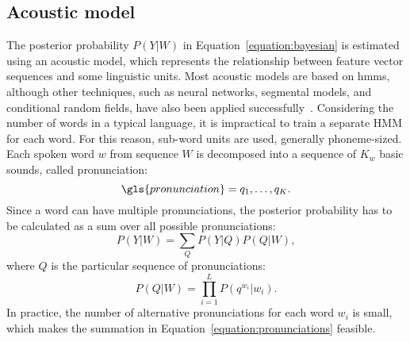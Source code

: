 \subsection{Acoustic model}
\label{subsection:acoustic}
The posterior probability $P(Y|W)$ in Equation~\ref{equation:bayesian} is estimated using an acoustic model, which represents the relationship between feature vector sequences and some linguistic units. Most acoustic models are based on \glspl{hmm}, although other techniques, such as neural networks, segmental models, and conditional random fields, have also been applied successfully~\cite{yu2009hidden, yu2008maximum, mohamed2012acoustic}. Considering the number of words in a typical language, it is impractical to train a separate HMM for each word. For this reason, sub-word units are used, generally phoneme-sized. Each spoken word $w$ from sequence $W$ is decomposed into a sequence of $K_{w}$ basic sounds, called pronunciation:
\begin{equation}
  \gls{pronunciation}=q_{1}, \ldots, q_{K}.
\end{equation}
Since a word can have multiple pronunciations, the posterior probability has to be calculated as a sum over all possible pronunciations:
\begin{equation}
  \label{equation:pronunciations}
  P(Y|W) = \sum_{Q}P(Y|Q)P(Q|W),
\end{equation}
where $Q$ is the particular sequence of pronunciations:
\begin{equation}
  P(Q|W)=\prod_{i=1}^{L}P(q^{w_{i}}|w_{i}).
\end{equation}
In practice, the number of alternative pronunciations for each word $w_{i}$ is small, which makes the summation in Equation~\ref{equation:pronunciations} feasible.



